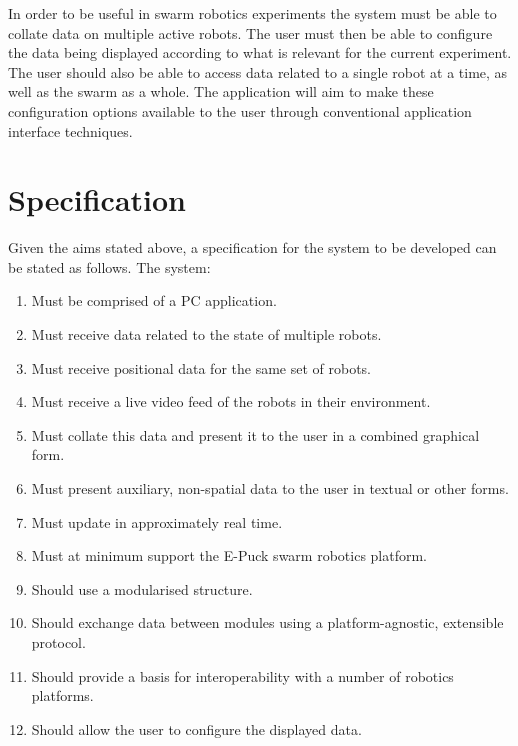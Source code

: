 \documentclass[titlepage,hidelinks,10pt]{article}
\begin{document}

In order to be useful in swarm robotics experiments the system must be able to collate data on multiple active robots. The user must then be able to configure the data being displayed according to what is relevant for the current experiment. The user should also be able to access data related to a single robot at a time, as well as the swarm as a whole. The application will aim to make these configuration options available to the user through conventional application interface techniques.

\section{Specification}
Given the aims stated above, a specification for the system to be developed can be stated as follows. The system:

\begin{enumerate}
	\item Must be comprised of a PC application.
	\item Must receive data related to the state of multiple robots.
	\item Must receive positional data for the same set of robots.
	\item Must receive a live video feed of the robots in their environment.
	\item Must collate this data and present it to the user in a combined graphical form.
	\item Must present auxiliary, non-spatial data to the user in textual or other forms.
	\item Must update in approximately real time.
	\item Must at minimum support the E-Puck swarm robotics platform.
	\item Should use a modularised structure.
	\item Should exchange data between modules using a platform-agnostic, extensible protocol.
	\item Should provide a basis for interoperability with a number of robotics platforms.
	\item Should allow the user to configure the displayed data.
\end{enumerate}
\end{document}
